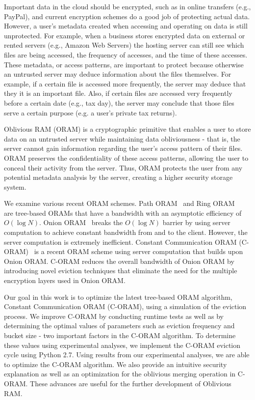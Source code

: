 \documentclass[12pt, oneside]{article}   	%
\begin{document}
Important data in the cloud should be encrypted, such as in online transfers (e.g., PayPal), and current encryption schemes do a good job of protecting actual data. However, a user's metadata created when accessing and operating on data is still unprotected. For example, when a business stores encrypted data on external or rented servers (e.g., Amazon Web Servers) the hosting server can still see which files are being accessed, the frequency of accesses, and the time of these accesses. These metadata, or access patterns, are important to protect because otherwise an untrusted server may deduce information about the files themselves. For example, if a certain file is accessed more frequently, the server may deduce that they it is an important file. Also, if certain files are accessed very frequently before a certain date (e.g., tax day), the server may conclude that those files serve a certain purpose (e.g. a user's private tax returns).

Oblivious RAM (ORAM) is a cryptographic primitive that enables a user to store data on an untrusted server while maintaining data obliviousness - that is, the server cannot gain information regarding the user's access pattern of their files. ORAM preserves the confidentiality of these access patterns, allowing the user to conceal their activity from the server. Thus, ORAM protects the user from any potential metadata analysis by the server, creating a higher security storage system.

We examine various recent ORAM schemes. Path ORAM~\cite{PathORAM} and Ring ORAM ~\cite{RingORAM} are tree-based ORAMs that have a bandwidth with an asymptotic efficiency of $O (\log N )$. Onion ORAM~\cite{OnionORAM} breaks the $O (\log N )$ barrier by using server computation to achieve constant bandwidth from and to the client. However, the server computation is extremely inefficient. Constant Communication ORAM (C-ORAM)~\cite{C-ORAM} is a recent ORAM scheme using server computation that builds upon Onion ORAM. C-ORAM reduces the overall bandwidth of Onion ORAM by introducing novel eviction techniques that eliminate the need for the multiple encryption layers used in Onion ORAM. 

Our goal in this work is to optimize the latest tree-based ORAM algorithm, Constant Communication ORAM (C-ORAM), using a simulation of the eviction process. We improve C-ORAM by conducting runtime tests as well as by determining the optimal values of parameters such as eviction frequency and bucket size - two important factors in the C-ORAM algorithm. To determine these values using experimental analyses, we implement the C-ORAM eviction cycle using Python 2.7. Using results from our experimental analyses, we are able to optimize the C-ORAM algorithm. We also provide an intuitive security explanation as well as an optimization for the oblivious merging operation in C-ORAM. These advances are useful for the further development of Oblivious RAM.
\end{document}
